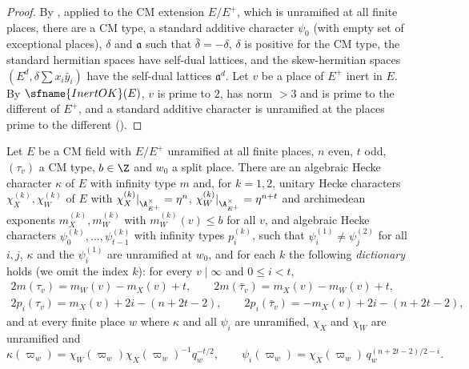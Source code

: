 \begin{proof}
By , applied to the CM extension $E/E^+$, which is unramified at all
finite places, there are a CM type, a standard additive character $\psi_0$ (with empty set of exceptional places), $\delta$
and $\mathfrak a$ such that $\bar\delta=-\delta$, $\delta$ is positive for the CM type, the standard hermitian spaces have
self-dual lattices, and the skew-hermitian spaces $(E^d,\delta\sum x_i\bar y_i)$ have the self-dual lattices
$\mathfrak a^d$. Let $v$ be a place of $E^+$ inert in $E$. By $\sfname{InertOK}(E)$, $v$ is prime to $2$, has norm $>3$ and
is prime to the different of $E^+$, and a standard additive character is unramified at the places prime to the different
().
\end{proof}

\begin{proposition}\label{pf:galred:chrpairs}
Let $E$ be a CM field with $E/E^+$ unramified at all finite places, $n$ even, $t$ odd, $(\tau_v)$ a CM type, $b\in\Z$ and
$w_0$ a split place. There are an algebraic Hecke character $\kappa$ of $E$ with infinity type $m$ and, for $k=1,2$, unitary
Hecke characters $\chi^{(k)}_X,\chi^{(k)}_W$ of $E$ with $\chi^{(k)}_X|_{\A_{E^+}^\times}=\eta^n$,
$\chi^{(k)}_W|_{\A_{E^+}^\times}=\eta^{n+t}$ and archimedean exponents $m^{(k)}_X,m^{(k)}_W$ with $m^{(k)}_W(v)\le b$ for all
$v$, and algebraic Hecke characters $\psi^{(k)}_0,\dots,\psi^{(k)}_{t-1}$ with infinity types $p^{(k)}_i$, such that
$\psi^{(1)}_i\ne\psi^{(2)}_j$ for all $i,j$, $\kappa$ and the $\psi^{(1)}_i$ are unramified at $w_0$, and for each $k$ the
following \emph{dictionary} holds (we omit the index $k$): for every $v\mid\infty$ and $0\le i<t$,
\begin{gather*}
  2m(\tau_v)=m_W(v)-m_X(v)+t,\qquad 2m(\bar\tau_v)=m_X(v)-m_W(v)+t,\\
  2p_i(\tau_v)=m_X(v)+2i-(n+2t-2),\qquad 2p_i(\bar\tau_v)=-m_X(v)+2i-(n+2t-2),
\end{gather*}
and at every finite place $w$ where $\kappa$ and all $\psi_i$ are unramified, $\chi_X$ and $\chi_W$ are unramified and
\[
  \kappa(\varpi_w)=\chi_W(\varpi_w)\chi_X(\varpi_w)^{-1}q_w^{-t/2},\qquad
  \psi_i(\varpi_w)=\chi_X(\varpi_w)\,q_w^{(n+2t-2)/2-i}.
\]
\end{proposition}

